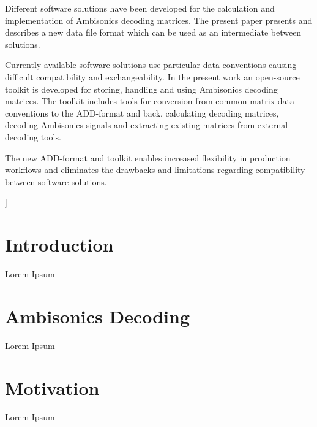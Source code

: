 \documentclass[a4paper, 10pt, twocolumn]{article}
\begin{document}
{\vspace{-3mm}}
\begin{onecolabstract}
{\vspace{3mm}}

Different software solutions have been developed for the calculation and implementation of Ambisonics decoding matrices. The present paper presents and describes a new data file format which can be used as an intermediate between solutions.

Currently available software solutions use particular data conventions causing difficult compatibility and exchangeability. In the present work an open-source toolkit is developed for storing, handling and using Ambisonics decoding matrices. The toolkit includes tools for conversion from common matrix data conventions to the ADD-format and back, calculating decoding matrices, decoding Ambisonics signals and extracting existing matrices from external decoding tools. 

The new ADD-format and toolkit enables increased flexibility in production workflows and eliminates the drawbacks and limitations regarding compatibility between software solutions.

\end{onecolabstract}
{\vspace{8mm}}]

\section{Introduction} \label{sec:introduction}


Lorem Ipsum \autocite{ambix}

\section{Ambisonics Decoding} \label{sec:AmbisonicsDecoding}

Lorem Ipsum \autocite{norm}



\section{Motivation} \label{sec:Motivation}

Lorem Ipsum \autocite{daniel}

\end{document}
